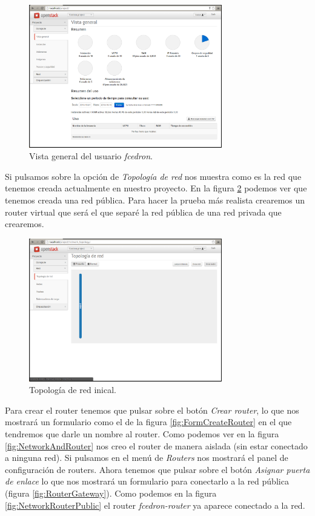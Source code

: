 \documentclass{article}
\begin{document}
\begin{figure}[h]
  \centering
    \includegraphics[width=0.75\textwidth]{img/m_010.png}
  \caption{Vista general del usuario \emph{fcedron}.}
  \label{fig:UserFcedron}
\end{figure}

	Si pulsamos sobre la opción de \emph{Topología de red} nos muestra como es la red que tenemos creada actualmente en nuestro proyecto. En la figura \ref{fig:NetworkInit} podemos ver que tenemos creada una red pública. Para hacer la prueba más realista crearemos un router virtual que será el que separé la red pública de una red privada que crearemos.

\begin{figure}[h]
  \centering
    \includegraphics[width=0.75\textwidth]{img/m_011.png}
  \caption{Topología de red inical.}
  \label{fig:NetworkInit}
\end{figure}

	Para crear el router tenemos que pulsar sobre el botón \emph{Crear router}, lo que nos mostrará un formulario como el de la figura \ref{fig:FormCreateRouter} en el que tendremos que darle un nombre al router. Como podemos ver en la figura \ref{fig:NetworkAndRouter} nos creo el router de manera aislada (sin estar conectado a ninguna red). Si pulsamos en el menú de \emph{Routers} nos mostrará el panel de configuración de routers. Ahora tenemos que pulsar sobre el botón \emph{Asignar puerta de enlace} lo que nos mostrará un formulario para conectarlo a la red pública (figura \ref{fig:RouterGateway}). Como podemos en la figura \ref{fig:NetworkRouterPublic} el router \emph{fcedron-router} ya aparece conectado a la red.
	
\end{document}

